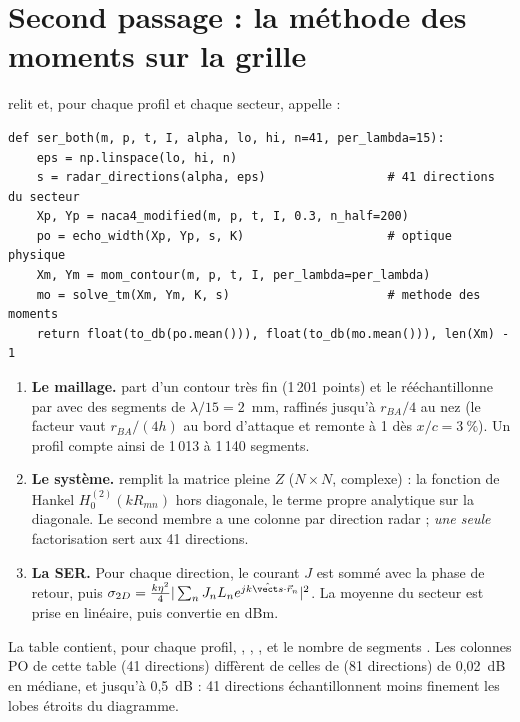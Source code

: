 \section{Second passage : la méthode des moments sur la grille}
 relit  et, pour chaque profil et chaque secteur, appelle  :
\begin{lstlisting}
def ser_both(m, p, t, I, alpha, lo, hi, n=41, per_lambda=15):
    eps = np.linspace(lo, hi, n)
    s = radar_directions(alpha, eps)                 # 41 directions du secteur
    Xp, Yp = naca4_modified(m, p, t, I, 0.3, n_half=200)
    po = echo_width(Xp, Yp, s, K)                    # optique physique
    Xm, Ym = mom_contour(m, p, t, I, per_lambda=per_lambda)
    mo = solve_tm(Xm, Ym, K, s)                      # methode des moments
    return float(to_db(po.mean())), float(to_db(mo.mean())), len(Xm) - 1
\end{lstlisting}
\begin{enumerate}
\item \textbf{Le maillage.}  part d'un contour très fin (1\,201 points) et le rééchantillonne par  avec des segments de $\lambda/15=2$~mm, raffinés jusqu'à $r_{BA}/4$ au nez (le facteur  vaut $r_{BA}/(4h)$ au bord d'attaque et remonte à 1 dès $x/c=3~\%$). Un profil compte ainsi de 1\,013 à 1\,140 segments.
\item \textbf{Le système.}  remplit la matrice pleine $Z$ ($N\times N$, complexe) : la fonction de Hankel $H_0^{(2)}(kR_{mn})$ hors diagonale, le terme propre analytique sur la diagonale. Le second membre a une colonne par direction radar ; \emph{une seule} factorisation sert aux 41 directions.
\item \textbf{La SER.} Pour chaque direction, le courant $J$ est sommé avec la phase de retour, puis $\sigma_{2D}=\frac{k\eta^2}4|\sum_nJ_nL_ne^{jk\shat\cdot\vec r_n}|^2$. La moyenne du secteur est prise en linéaire, puis convertie en dBm.
\end{enumerate}
La table  contient, pour chaque profil, , , ,  et le nombre de segments . Les colonnes PO de cette table (41 directions) diffèrent de celles de  (81 directions) de 0,02~dB en médiane, et jusqu'à 0,5~dB : 41 directions échantillonnent moins finement les lobes étroits du diagramme.

